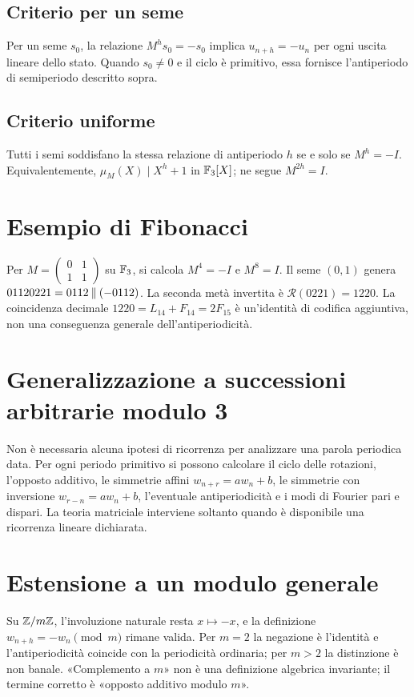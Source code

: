 \documentclass[11pt,a4paper]{article}
\begin{document}
\subsection{Criterio per un seme}
Per un seme \(s_0\), la relazione \(M^hs_0=-s_0\) implica \(u_{n+h}=-u_n\) per ogni uscita lineare dello stato. Quando \(s_0\neq0\) e il ciclo è primitivo, essa fornisce l’antiperiodo di semiperiodo descritto sopra.
\subsection{Criterio uniforme}
Tutti i semi soddisfano la stessa relazione di antiperiodo \(h\) se e solo se \(M^h=-I\). Equivalentemente, \(\mu_M(X)\mid X^h+1\) in \(\mathbb F_3[X]\); ne segue \(M^{2h}=I\).
\section{Esempio di Fibonacci}
Per \(M=\begin{pmatrix}0&1\\1&1\end{pmatrix}\) su \(\mathbb F_3\), si calcola \(M^4=-I\) e \(M^8=I\). Il seme \((0,1)\) genera \(01120221=0112\mathbin{\Vert}(-0112)\). La seconda metà invertita è \(\mathcal R(0221)=1220\). La coincidenza decimale \(1220=L_{14}+F_{14}=2F_{15}\) è un’identità di codifica aggiuntiva, non una conseguenza generale dell’antiperiodicità.
\section{Generalizzazione a successioni arbitrarie modulo 3}
Non è necessaria alcuna ipotesi di ricorrenza per analizzare una parola periodica data. Per ogni periodo primitivo si possono calcolare il ciclo delle rotazioni, l’opposto additivo, le simmetrie affini \(w_{n+r}=aw_n+b\), le simmetrie con inversione \(w_{r-n}=aw_n+b\), l’eventuale antiperiodicità e i modi di Fourier pari e dispari. La teoria matriciale interviene soltanto quando è disponibile una ricorrenza lineare dichiarata.
\section{Estensione a un modulo generale}
Su \(\mathbb Z/m\mathbb Z\), l’involuzione naturale resta \(x\mapsto-x\), e la definizione \(w_{n+h}=-w_n\pmod m\) rimane valida. Per \(m=2\) la negazione è l’identità e l’antiperiodicità coincide con la periodicità ordinaria; per \(m>2\) la distinzione è non banale. «Complemento a \(m\)» non è una definizione algebrica invariante; il termine corretto è «opposto additivo modulo \(m\)».
\end{document}
